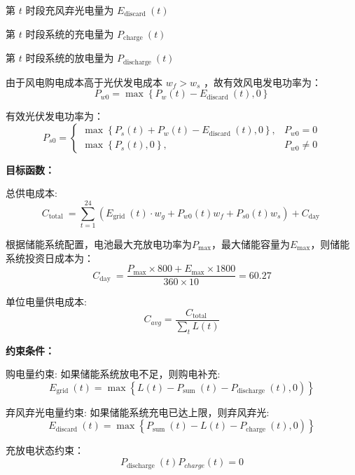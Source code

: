 \documentclass{cumcmthesis}
\begin{document}
第 $t$ 时段充风弃光电量为 $E_{\text {discard }}(t)$

第 $t$ 时段系统的充电量为 $P_{\text {charge }}(t)$

第 $t$ 时段系统的放电量为 $P_{\text {discharge }}(t)$


由于风电购电成本高于光伏发电成本 $w_f>w_s$ ，故有效风电发电功率为：
\begin{equation}
P_{w 0}=\max \left\{P_w(t)-E_{\text {discard }}(t), 0\right\}
\end{equation}

有效光伏发电功率为：
\begin{equation}
P_{s 0}= \begin{cases}\max \left\{P_s(t)+P_w(t)-E_{\text {discard }}(t), 0\right\}, & P_{w 0}=0 \\ \max \left\{P_s(t), 0\right\}, & P_{w 0} \neq 0\end{cases}
\end{equation}

\textbf{目标函数：}

总供电成本:
\begin{equation}
C_{\text {total }}=\sum_{t=1}^{24}\left(E_{\text {grid }}(t) \cdot w_g+P_{w 0}(t) w_f+P_{s 0}(t) w_s\right)+C_{\text {day }}
\end{equation}

根据储能系统配置，电池最大充放电功率为$P_{\max }$，最大储能容量为$E_{\max }$，则储能系统投资日成本为：
$$
C_{\text {day }}=\frac{P_{\max } \times 800+E_{\max } \times 1800}{360 \times 10}=60.27 
$$

单位电量供电成本:
\begin{equation}
C_{a v g}=\frac{C_{\text {total }}}{\sum_t L(t)}
\end{equation}

\textbf{约束条件：}

购电量约束: 如果储能系统放电不足，则购电补充:
\begin{equation}
\left.E_{\text {grid }}(t)=\max \left\{L(t)-P_{\text {sum }}(t)-P_{\text {discharge }}(t), 0\right)\right\}
\end{equation}

弃风弃光电量约束: 如果储能系统充电已达上限，则弃风弃光: 
\begin{equation}
\left.E_{\text {discard }}(t)=\max \left\{P_{\text {sum }}(t)-L(t)-P_{\text {charge }}(t), 0\right)\right\}
\end{equation}

充放电状态约束：
\begin{equation}
P_{\text {discharge }}(t) P_{charge}(t)=0
\end{equation}
\end{document}

